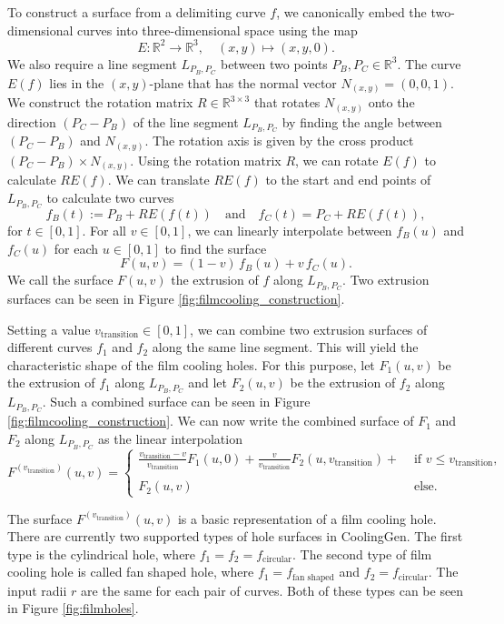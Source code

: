 \documentclass[a4paper, 11pt]{report}
\theoremstyle{definition}
\begin{document}
	To construct a surface from a delimiting curve $f$, we canonically embed the two-dimensional curves into three-dimensional space using the map
		$$ E: \mathbb{R}^2 \rightarrow \mathbb{R}^3, \quad (x, y) \mapsto (x, y, 0). $$
	We also require a line segment $L_{P_B,P_C}$ between two points $P_B, P_C \in \mathbb{R}^3$.
	The curve $E(f)$ lies in the $(x,y)$-plane that has the normal vector $N_{(x,y)} = (0, 0, 1)$. We construct the rotation matrix $R \in \mathbb{R}^{3 \times 3}$ that rotates $N_{(x,y)}$ onto the direction $(P_C-P_B)$ of the line segment $L_{P_B,P_C}$ by finding the angle between $(P_C-P_B)$ and $N_{(x,y)}$. The rotation axis is given by the cross product $(P_C-P_B) \times N_{(x,y)}$. Using the rotation matrix $R$, we can rotate $E(f)$ to calculate $RE(f)$. We can translate $RE(f)$ to the start and end points of $L_{P_B,P_C}$ to calculate two curves
		$$ f_B(t) := P_B+RE(f(t)) \quad\textrm{and}\quad f_C(t) = P_C+RE(f(t)), $$
	for $t \in [0,1]$.
	For all $v \in [0,1]$, we can linearly interpolate between $f_B(u)$ and $f_C(u)$ for each $u \in [0,1]$ to find the surface 
		$$F(u,v) = (1-v)\,f_B(u) + v\,f_C(u).$$
	We call the surface $F(u,v)$ the extrusion of $f$ along $L_{P_B,P_C}$. Two extrusion surfaces can be seen in Figure \ref{fig:filmcooling_construction}.

	Setting a value $v_\textrm{transition} \in [0,1]$, we can combine two extrusion surfaces of different curves $f_1$ and $f_2$ along the same line segment. This will yield the characteristic shape of the film cooling holes. For this purpose, let $F_1(u,v)$ be the extrusion of $f_1$ along $L_{P_B,P_C}$ and let $F_2(u,v)$ be the extrusion of $f_2$ along $L_{P_B,P_C}$. Such a combined surface can be seen in Figure \ref{fig:filmcooling_construction}. We can now write the combined surface of $F_1$ and $F_2$ along $L_{P_B,P_C}$ as the linear interpolation
		$$
			F^{(v_\textrm{transition})}(u,v) = 
				\begin{cases}
					\frac{v_\textrm{transition}-v}{v_\textrm{transition}} F_1(u,0) + 
					\frac{v}{v_\textrm{transition}} F_2(u,v_\textrm{transition}) + 
					& \textrm{ if } v \leq v_\textrm{transition}, \\

					\\[-0.5em]
					
					F_2(u,v)
					& \textrm{ else.} 
				\end{cases}
		$$

	The surface $F^{(v_\textrm{transition})}(u,v)$ is a basic representation of a film cooling hole. There are currently two supported types of hole surfaces in CoolingGen. The first type is the cylindrical hole, where $f_1 = f_2 = f_\textrm{circular}$. The second type of film cooling hole is called fan shaped hole, where $f_1 = f_\textrm{fan shaped}$ and $f_2 = f_\textrm{circular}$. The input radii $r$ are the same for each pair of curves. Both of these types can be seen in Figure \ref{fig:filmholes}.
\end{document}
